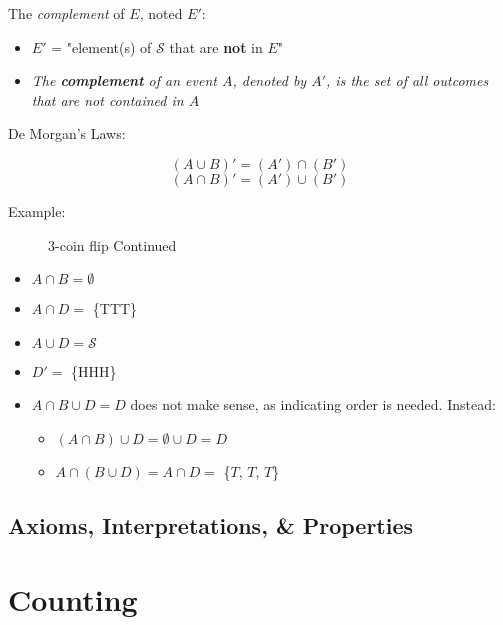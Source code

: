 \documentclass[12pt]{article}
\begin{document}
\begin{description}
    \item[The \textit{complement} of $E$, noted $E'$:] 
\end{description}
\begin{itemize}
    \item $E'$ = "element(s) of $\mathcal{S}$ that are \textbf{not} in $E$"
    \item[] \textit{The \textbf{complement} of an event $A$, denoted by $A'$, is the set of all outcomes that are not contained in $A$}
\end{itemize}

\begin{description}
    \item[De Morgan's Laws:] 
\end{description}
 \[ (A \cup B)' = (A') \cap (B') \]
 \[ (A \cap B)' = (A') \cup (B') \]

\begin{description}
    \item[Example:] 3-coin flip Continued
\end{description}
\begin{itemize}
    \item $A \cap B = \emptyset$
    \item $A \cap D =$ \{TTT\}
    \item $A \cup D = \mathcal{S}$
    \item $D' =$ \{HHH\}
    \item $A \cap B \cup D = D$ does not make sense, as indicating order is needed. Instead:
    \begin{itemize}
        \item $(A \cap B) \cup D = \emptyset \cup D = D$
        \item $A \cap (B \cup D) = A \cap D =$ \{$T$, $T$, $T$\}
    \end{itemize}
\end{itemize}

\subsection{Axioms, Interpretations, \& Properties}

\section{Counting}
\end{document}
